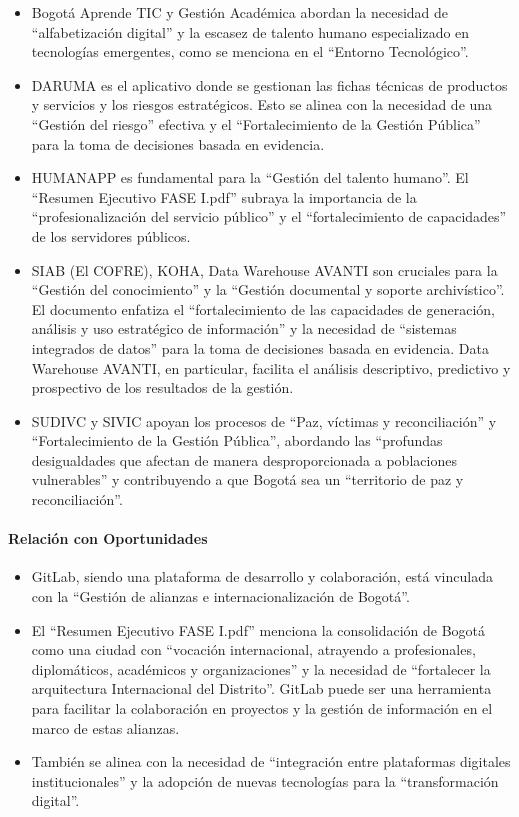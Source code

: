 \documentclass[
	a4paper, %
	12pt, %
]{include/CSSullivanBusinessReport}
\def\tightlist{}
\begin{document}
\begin{itemize}
\tightlist
\item
  Bogotá Aprende TIC y Gestión Académica abordan la necesidad de
  ``alfabetización digital'' y la escasez de talento humano
  especializado en tecnologías emergentes, como se menciona en el
  ``Entorno Tecnológico''.
\item
  DARUMA es el aplicativo donde se gestionan las fichas técnicas de
  productos y servicios y los riesgos estratégicos. Esto se alinea con
  la necesidad de una ``Gestión del riesgo'' efectiva y el
  ``Fortalecimiento de la Gestión Pública'' para la toma de decisiones
  basada en evidencia.
\item
  HUMANAPP es fundamental para la ``Gestión del talento humano''. El
  ``Resumen Ejecutivo FASE I.pdf'' subraya la importancia de la
  ``profesionalización del servicio público'' y el ``fortalecimiento de
  capacidades'' de los servidores públicos.
\item
  SIAB (El COFRE), KOHA, Data Warehouse AVANTI son cruciales para la
  ``Gestión del conocimiento'' y la ``Gestión documental y soporte
  archivístico''. El documento enfatiza el ``fortalecimiento de las
  capacidades de generación, análisis y uso estratégico de información''
  y la necesidad de ``sistemas integrados de datos'' para la toma de
  decisiones basada en evidencia. Data Warehouse AVANTI, en particular,
  facilita el análisis descriptivo, predictivo y prospectivo de los
  resultados de la gestión.
\item
  SUDIVC y SIVIC apoyan los procesos de ``Paz, víctimas y
  reconciliación'' y ``Fortalecimiento de la Gestión Pública'',
  abordando las ``profundas desigualdades que afectan de manera
  desproporcionada a poblaciones vulnerables'' y contribuyendo a que
  Bogotá sea un ``territorio de paz y reconciliación''.
\end{itemize}

\paragraph{Relación con
Oportunidades}\label{sec:relaciuxf3n-con-oportunidades-1}

\begin{itemize}
\tightlist
\item
  GitLab, siendo una plataforma de desarrollo y colaboración, está
  vinculada con la ``Gestión de alianzas e internacionalización de
  Bogotá''.
\item
  El ``Resumen Ejecutivo FASE I.pdf'' menciona la consolidación de
  Bogotá como una ciudad con ``vocación internacional, atrayendo a
  profesionales, diplomáticos, académicos y organizaciones'' y la
  necesidad de ``fortalecer la arquitectura Internacional del
  Distrito''. GitLab puede ser una herramienta para facilitar la
  colaboración en proyectos y la gestión de información en el marco de
  estas alianzas.
\item
  También se alinea con la necesidad de ``integración entre plataformas
  digitales institucionales'' y la adopción de nuevas tecnologías para
  la ``transformación digital''.
\end{itemize}
\end{document}
